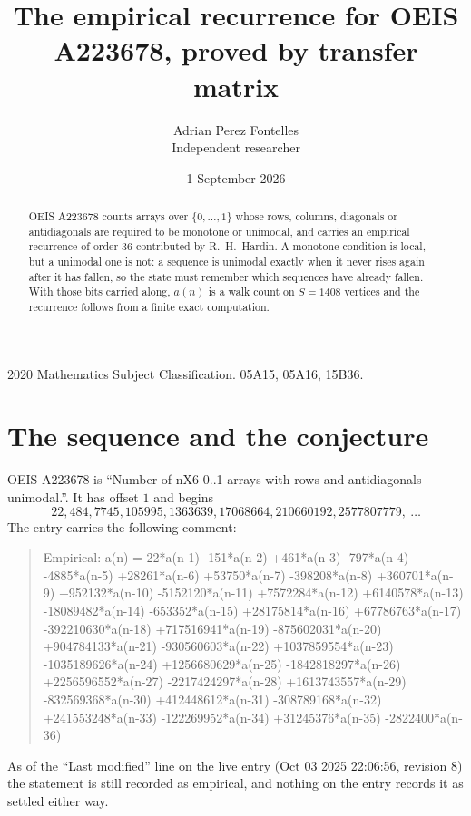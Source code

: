 \documentclass[11pt,a4paper]{article}
\title{The empirical recurrence for OEIS A223678, proved by transfer matrix}
\author{Adrian Perez Fontelles\\ \small Independent researcher}
\date{1 September 2026}
\theoremstyle{plain}
\theoremstyle{definition}
\begin{document}
\maketitle

\begin{abstract}
OEIS A223678 counts arrays over $\{0,\dots,1\}$ whose rows, columns, diagonals or
antidiagonals are required to be monotone or unimodal, and carries an empirical recurrence of
order $36$ contributed by R.~H.~Hardin. A monotone condition is local, but a unimodal one
is not: a sequence is unimodal exactly when it never rises again after it has fallen, so the
state must remember which sequences have already fallen. With those bits carried along, $a(n)$
is a walk count on $S=1408$ vertices and the recurrence follows from a finite exact
computation.
\end{abstract}

\noindent\small 2020 Mathematics Subject Classification. 05A15, 05A16, 15B36.\normalsize

\section{The sequence and the conjecture}

OEIS A223678 is ``Number of nX6 0..1 arrays with rows and antidiagonals unimodal.''. It has offset $1$ and begins
\[
22, 484, 7745, 105995, 1363639, 17068664, 210660192, 2577807779,\ \dots
\]
The entry carries the following comment:
\begin{quote}\small
Empirical: a(n) = 22*a(n-1) -151*a(n-2) +461*a(n-3) -797*a(n-4) -4885*a(n-5) +28261*a(n-6) +53750*a(n-7) -398208*a(n-8) +360701*a(n-9) +952132*a(n-10) -5152120*a(n-11) +7572284*a(n-12) +6140578*a(n-13) -18089482*a(n-14) -653352*a(n-15) +28175814*a(n-16) +67786763*a(n-17) -392210630*a(n-18) +717516941*a(n-19) -875602031*a(n-20) +904784133*a(n-21) -930560603*a(n-22) +1037859554*a(n-23) -1035189626*a(n-24) +1256680629*a(n-25) -1842818297*a(n-26) +2256596552*a(n-27) -2217424297*a(n-28) +1613743557*a(n-29) -832569368*a(n-30) +412448612*a(n-31) -308789168*a(n-32) +241553248*a(n-33) -122269952*a(n-34) +31245376*a(n-35) -2822400*a(n-36)
\end{quote}
As of the ``Last modified'' line on the live entry (Oct 03 2025 22:06:56, revision 8) the statement is
still recorded as empirical, and nothing on the entry records it as settled either way.
\end{document}
